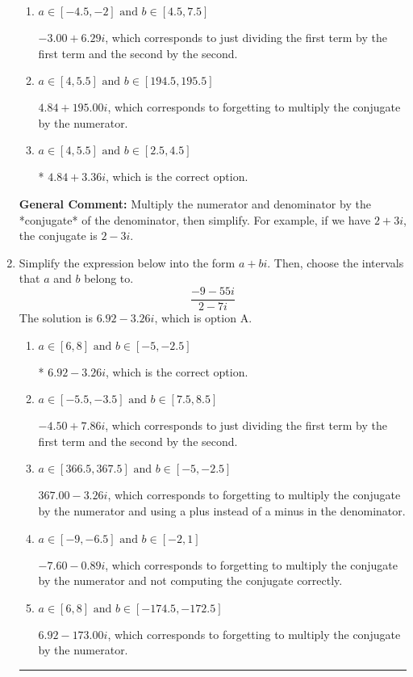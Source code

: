 \documentclass{extbook}[14pt]
\newcommand{\litem}[1]{\item #1

\rule{\textwidth}{0.4pt}}
\begin{document}
\begin{enumerate}
{\begin{enumerate}[label=\Alph*.]
 $281.00  + 3.36 i$, which corresponds to forgetting to multiply the conjugate by the numerator and using a plus instead of a minus in the denominator.
\item \( a \in [-4.5, -2] \text{ and } b \in [4.5, 7.5] \)

 $-3.00  + 6.29 i$, which corresponds to just dividing the first term by the first term and the second by the second.
\item \( a \in [4, 5.5] \text{ and } b \in [194.5, 195.5] \)

 $4.84  + 195.00 i$, which corresponds to forgetting to multiply the conjugate by the numerator.
\item \( a \in [4, 5.5] \text{ and } b \in [2.5, 4.5] \)

* $4.84  + 3.36 i$, which is the correct option.
\end{enumerate}

\textbf{General Comment:} Multiply the numerator and denominator by the *conjugate* of the denominator, then simplify. For example, if we have $2+3i$, the conjugate is $2-3i$.
}
\litem{
Simplify the expression below into the form $a+bi$. Then, choose the intervals that $a$ and $b$ belong to.
\[ \frac{-9 - 55 i}{2 - 7 i} \]The solution is \( 6.92  - 3.26 i \), which is option A.\begin{enumerate}[label=\Alph*.]
\item \( a \in [6, 8] \text{ and } b \in [-5, -2.5] \)

* $6.92  - 3.26 i$, which is the correct option.
\item \( a \in [-5.5, -3.5] \text{ and } b \in [7.5, 8.5] \)

 $-4.50  + 7.86 i$, which corresponds to just dividing the first term by the first term and the second by the second.
\item \( a \in [366.5, 367.5] \text{ and } b \in [-5, -2.5] \)

 $367.00  - 3.26 i$, which corresponds to forgetting to multiply the conjugate by the numerator and using a plus instead of a minus in the denominator.
\item \( a \in [-9, -6.5] \text{ and } b \in [-2, 1] \)

 $-7.60  - 0.89 i$, which corresponds to forgetting to multiply the conjugate by the numerator and not computing the conjugate correctly.
\item \( a \in [6, 8] \text{ and } b \in [-174.5, -172.5] \)

 $6.92  - 173.00 i$, which corresponds to forgetting to multiply the conjugate by the numerator.
\end{enumerate}

}
\end{enumerate}
\end{document}
